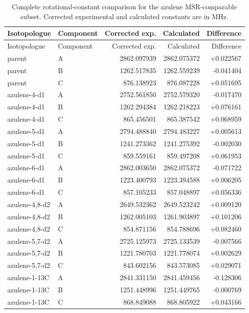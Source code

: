 \documentclass[12pt]{article}
\begin{document}
\begin{longtable}{llrrr}
\caption{Complete rotational-constant comparison for the azulene MSR-comparable subset. Corrected experimental and calculated constants are in MHz.}\label{tab:si-azulene-rotconstants}\\
\toprule
Isotopologue & Component & Corrected exp. & Calculated & Difference \\
\midrule
\endfirsthead
\toprule
Isotopologue & Component & Corrected exp. & Calculated & Difference \\
\midrule
\endhead
parent & A & 2862.097939 & 2862.075372 & +0.022567 \\
parent & B & 1262.517835 & 1262.559239 & -0.041404 \\
parent & C & 876.138923 & 876.087228 & +0.051695 \\
azulene-4-d1 & A & 2752.561850 & 2752.579320 & -0.017470 \\
azulene-4-d1 & B & 1262.294384 & 1262.218223 & +0.076161 \\
azulene-4-d1 & C & 865.456501 & 865.387542 & +0.068959 \\
azulene-5-d1 & A & 2794.488840 & 2794.483227 & +0.005613 \\
azulene-5-d1 & B & 1241.273362 & 1241.275392 & -0.002030 \\
azulene-5-d1 & C & 859.559161 & 859.497208 & +0.061953 \\
azulene-6-d1 & A & 2862.003650 & 2862.075372 & -0.071722 \\
azulene-6-d1 & B & 1223.400793 & 1223.394588 & +0.006205 \\
azulene-6-d1 & C & 857.105233 & 857.048897 & +0.056336 \\
azulene-4,8-d2 & A & 2649.532362 & 2649.523242 & +0.009120 \\
azulene-4,8-d2 & B & 1262.005103 & 1261.903897 & +0.101206 \\
azulene-4,8-d2 & C & 854.871156 & 854.788696 & +0.082460 \\
azulene-5,7-d2 & A & 2725.125973 & 2725.133539 & -0.007566 \\
azulene-5,7-d2 & B & 1221.780703 & 1221.778074 & +0.002629 \\
azulene-5,7-d2 & C & 843.602156 & 843.573085 & +0.029071 \\
azulene-1-13C & A & 2841.331150 & 2841.459456 & -0.128306 \\
azulene-1-13C & B & 1251.448996 & 1251.449765 & -0.000769 \\
azulene-1-13C & C & 868.849088 & 868.805922 & +0.043166 \\

\end{longtable}
\end{document}
